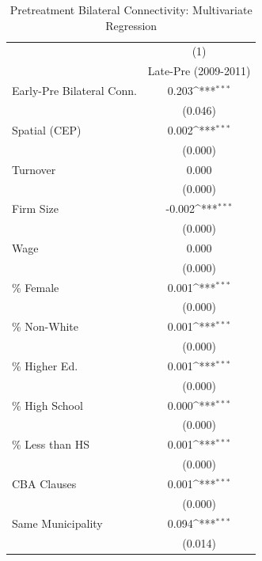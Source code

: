 \begin{table}[htbp]\centering
\def\sym#1{\ifmmode^{#1}\else\(^{#1}\)\fi}
\caption{Pretreatment Bilateral Connectivity: Multivariate Regression}
\begin{tabular}{l*{1}{c}}
\toprule
                    &\multicolumn{1}{c}{(1)}\\
                    &\multicolumn{1}{c}{Late-Pre (2009-2011)}\\
\midrule
Early-Pre Bilateral Conn.&       0.203\sym{***}\\
                    &     (0.046)         \\
\addlinespace
Spatial (CEP)       &       0.002\sym{***}\\
                    &     (0.000)         \\
\addlinespace
Turnover            &       0.000         \\
                    &     (0.000)         \\
\addlinespace
Firm Size           &      -0.002\sym{***}\\
                    &     (0.000)         \\
\addlinespace
Wage                &       0.000         \\
                    &     (0.000)         \\
\addlinespace
\% Female           &       0.001\sym{***}\\
                    &     (0.000)         \\
\addlinespace
\% Non-White        &       0.001\sym{***}\\
                    &     (0.000)         \\
\addlinespace
\% Higher Ed.       &       0.001\sym{***}\\
                    &     (0.000)         \\
\addlinespace
\% High School      &       0.000\sym{***}\\
                    &     (0.000)         \\
\addlinespace
\% Less than HS     &       0.001\sym{***}\\
                    &     (0.000)         \\
\addlinespace
CBA Clauses         &       0.001\sym{***}\\
                    &     (0.000)         \\
\addlinespace
Same Municipality   &       0.094\sym{***}\\
                    &     (0.014)         \\

\end{tabular}
\end{table}
